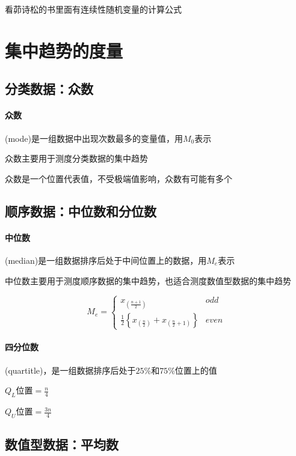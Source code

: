 \documentclass[UTF8,10pt]{book}
\begin{document}
        {\kaishu 看茆诗松的书里面有连续性随机变量的计算公式}
    \section{集中趋势的度量}
        \subsection{分类数据：众数}
            \paragraph{众数} (mode)是一组数据中出现次数最多的变量值，用$M_0$表示

            {\kaishu 众数主要用于测度分类数据的集中趋势}

            {\kaishu 众数是一个位置代表值，不受极端值影响，众数有可能有多个}

        \subsection{顺序数据：中位数和分位数}
            \paragraph{中位数}(median)是一组数据排序后处于中间位置上的数据，用$M_e$表示

            {\kaishu 中位数主要用于测度顺序数据的集中趋势，也适合测度数值型数据的集中趋势}

            $$M_{e}=\left\{\begin{array}{ll}
                x_{\left(\frac{n+1}{2}\right)} & odd \\
                \frac{1}{2}\left\{x_{\left(\frac{n}{2}\right)}+x_{\left(\frac{n}{2}+1\right)}\right\} & even
                \end{array}\right.$$
            
            \paragraph{四分位数}(quartitle)，是一组数据排序后处于$25\% $和$75\% $位置上的值

            $Q_L$位置$=\frac{n}{4}$

            $Q_U$位置$=\frac{3n}{4}$


        \subsection{数值型数据：平均数}
\end{document}
